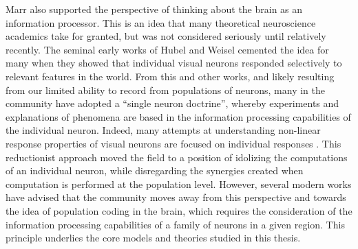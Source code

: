 Marr also supported the perspective of thinking about the brain as an information processor. This is an idea that many theoretical neuroscience academics take for granted, but was not considered seriously until relatively recently. The seminal early works of Hubel and Weisel \citeyearpar{hubel1959receptive} cemented the idea for many when they showed that individual visual neurons responded selectively to relevant features in the world. From this and other works, and likely resulting from our limited ability to record from populations of neurons, many in the community have adopted a ``single neuron doctrine'', whereby experiments and explanations of phenomena are based in the information processing capabilities of the individual neuron. Indeed, many attempts at understanding non-linear response properties of visual neurons are focused on individual responses \parencite{priebe2012mechanisms}. This reductionist approach moved the field to a position of idolizing the computations of an individual neuron, while disregarding the synergies created when computation is performed at the population level. However, several modern works have advised that the community moves away from this perspective \parencite{barlow1972single, olshausen1999probabilistic, zetzsche1999atoms, series2003silent} and towards the idea of population coding in the brain, which requires the consideration of the information processing capabilities of a family of neurons in a given region. This principle underlies the core models and theories studied in this thesis.

